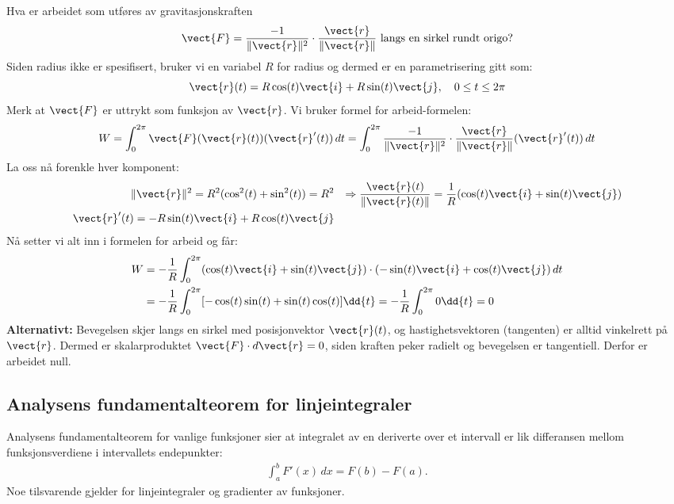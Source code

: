 \begin{eks}{}
Hva er arbeidet som utføres av gravitasjonskraften
\[
\vect{F} = \frac{-1}{\lVert\vect{r}\rVert^2} \cdot \frac{\vect{r}}{\lVert \vect{r}\rVert} \text{  langs en sirkel rundt origo?}
\]
Siden radius ikke er spesifisert, bruker vi en variabel $R$ for radius og dermed er en parametrisering gitt som:
\[
\vect{r}(t) = R \cos(t) \vect{i} + R \sin(t) \vect{j}, \quad 0\leq t\leq 2\pi
\]
Merk at $\vect{F}$ er uttrykt som funksjon av $\vect{r}$. Vi bruker formel for arbeid-formelen:
\[
W = \int_0^{2\pi} \vect{F}(\vect{r}(t))(\vect{r}'(t))\, dt= \int_0^{2\pi}\frac{-1}{\lVert\vect{r}\rVert^2} \cdot \frac{\vect{r}}{\lVert \vect{r}\rVert}(\vect{r}'(t))\,dt
\]
La oss nå forenkle hver komponent:
\begin{align*}
\lVert\vect{r}\rVert^2 = R^2 (\cos^2(t) + \sin^2(t)) = R^2 
& &\Rightarrow \frac{\vect{r}(t)}{\lVert \vect{r}(t)\rVert} = \frac{1}{R}(\cos(t)\vect{i}+\sin(t)\vect{j})\\
\vect{r}'(t)=-R\sin(t)\vect{i}+R\cos(t)\vect{j}
\end{align*}
Nå setter vi alt inn i formelen for arbeid og får:
\begin{align*}
W &= -\frac{1}{R} \int_0^{2\pi} (\cos(t) \vect{i} + \sin(t) \vect{j}) \cdot (-\sin(t) \vect{i} + \cos(t) \vect{j})\, d t\\
 &= -\frac{1}{R} \int_0^{2\pi} [- \cos(t) \sin(t) +  \sin(t) \cos(t)] \dd{t}
= -\frac{1}{R} \int_0^{2\pi} 0 \dd{t} = 0
\end{align*}
\textbf{Alternativt:} Bevegelsen skjer langs en sirkel med posisjonvektor $\vect{r}(t)$, og hastighetsvektoren (tangenten) er alltid vinkelrett på $\vect{r}$. Dermed er skalarproduktet $\vect{F} \cdot d \vect{r} = 0$, siden kraften peker radielt og bevegelsen er tangentiell. Derfor er arbeidet null.
\end{eks}

%
%
%
\subsection*{Analysens fundamentalteorem for linjeintegraler}

Analysens fundamentalteorem for vanlige funksjoner sier at integralet av en deriverte over et intervall er lik differansen mellom funksjonsverdiene i intervallets endepunkter:
\begin{align}\label{ana_fun_thm}
\int_a^b F'(x)\, dx = F(b) - F(a).
\end{align}
Noe tilsvarende gjelder for linjeintegraler og gradienter av funksjoner.

